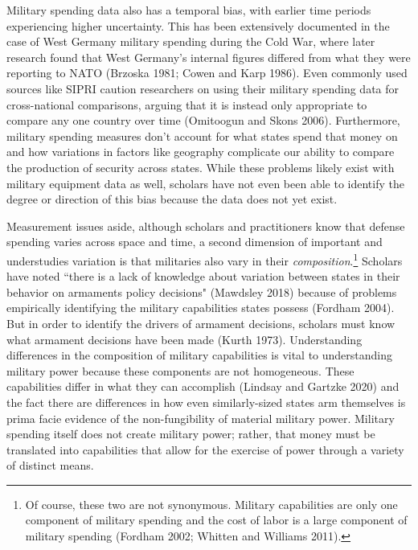 \documentclass[
]{article}
\begin{document}
Military spending data also has a temporal bias, with earlier time periods experiencing higher uncertainty. This has been extensively documented in the case of West Germany military spending during the Cold War, where later research found that West Germany's internal figures differed from what they were reporting to NATO (Brzoska 1981; Cowen and Karp 1986). Even commonly used sources like SIPRI caution researchers on using their military spending data for cross-national comparisons, arguing that it is instead only appropriate to compare any one country over time (Omitoogun and Skons 2006). Furthermore, military spending measures don't account for what states spend that money on and how variations in factors like geography complicate our ability to compare the production of security across states. While these problems likely exist with military equipment data as well, scholars have not even been able to identify the degree or direction of this bias because the data does not yet exist.

Measurement issues aside, although scholars and practitioners know that defense spending varies across space and time, a second dimension of important and understudies variation is that militaries also vary in their \textit{composition}.\footnote{Of course, these two are not synonymous. Military capabilities are only one component of military spending and the cost of labor is a large component of military spending (Fordham 2002; Whitten and Williams 2011).} Scholars have noted ``there is a lack of knowledge about variation between states in their behavior on armaments policy decisions" (Mawdsley 2018) because of problems empirically identifying the military capabilities states possess (Fordham 2004). But in order to identify the drivers of armament decisions, scholars must know what armament decisions have been made (Kurth 1973). Understanding differences in the composition of military capabilities is vital to understanding military power because these components are not homogeneous. These capabilities differ in what they can accomplish (Lindsay and Gartzke 2020) and the fact there are differences in how even similarly-sized states arm themselves is prima facie evidence of the non-fungibility of material military power. Military spending itself does not create military power; rather, that money must be translated into capabilities that allow for the exercise of power through a variety of distinct means.
\end{document}
